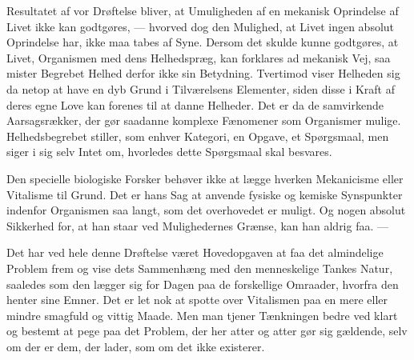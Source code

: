 \documentclass[12pt]{article}
\newcommand{\opage}[1]{\marginnote{\footnotesize\textit{[#1]}}}
\begin{document}
Resultatet af vor Drøftelse bliver, at Umuligheden af en mekanisk Oprindelse
af Livet ikke kan godtgøres, --- hvorved dog den Mulighed, at Livet ingen absolut
Oprindelse har, ikke maa tabes af Syne. Dersom det skulde kunne godtgøres, at
Livet, Organismen med dens Helhedspræg, kan forklares ad mekanisk Vej, saa
mister Begrebet Helhed derfor ikke sin Betydning. Tvertimod viser Helheden sig
da netop at have en dyb Grund i Tilværelsens Elementer, siden disse i Kraft af
deres egne Love kan forenes til at danne Helheder. Det er da de samvirkende
Aarsagsrækker, der gør saadanne komplexe Fænomener som Organismer mulige.
Helhedsbegrebet stiller, som enhver Kategori, en Opgave, et Spørgsmaal, men siger i
sig selv Intet om, hvorledes dette Spørgsmaal skal besvares.

Den specielle biologiske Forsker behøver ikke at lægge hverken Mekanicisme
eller Vitalisme til Grund. Det er hans Sag at anvende fysiske og kemiske
Synspunkter indenfor Organismen saa langt, som det overhovedet er muligt. Og nogen
absolut Sikkerhed for, at han staar ved Mulighedernes Grænse, kan han aldrig faa. ---

Det har ved hele denne Drøftelse været Hovedopgaven at faa det almindelige
\opage{56}Problem frem og vise dets Sammenhæng med den menneskelige Tankes Natur,
saaledes som den lægger sig for Dagen paa de forskellige Omraader, hvorfra den henter
sine Emner. Det er let nok at spotte over Vitalismen paa en mere eller mindre
smagfuld og vittig Maade. Men man tjener Tænkningen bedre ved klart og bestemt
at pege paa det Problem, der her atter og atter gør sig gældende, selv om der er
dem, der lader, som om det ikke existerer.
\end{document}
